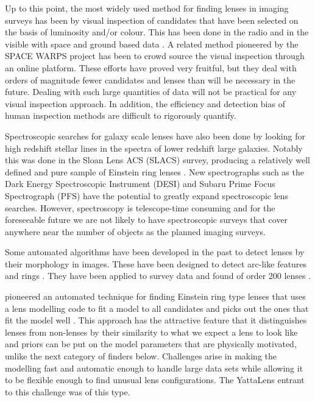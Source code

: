 \documentclass{aa}
\begin{document}
Up to this point, the most widely used method for finding lenses in imaging surveys has been by visual inspection of candidates that have been selected on the basis of luminosity and/or colour.  This has been done in the radio \citep{2003MNRAS.341...13B} and in the visible with space and ground based data \citep{2008MNRAS.389.1311J,2008ApJS..176...19F,2010AandA...517A..25S,2014MNRAS.439.3392P}.  A related method pioneered by the SPACE WARPS project \citep{2016MNRAS.455.1171M,2016MNRAS.455.1191M,2015MNRAS.452..502G} has been to crowd source the visual inspection through an online platform.  These efforts have proved very fruitful, but they deal with orders of magnitude fewer candidates and lenses than will be necessary in the future.  Dealing with such large quantities of data will not be practical for any visual inspection approach.  In addition, the efficiency and detection bias of human inspection methods are difficult to rigorously quantify.

Spectroscopic searches for galaxy scale lenses have also been done by looking for high redshift stellar lines in the spectra of lower redshift large galaxies.  Notably this was done in the Sloan Lens ACS (SLACS) survey, producing a relatively well defined and pure sample of Einstein ring lenses \citep{2006MNRAS.369.1521W,2006ApJ...638..703B,2012ApJ...744...41B,2015MNRAS.449.3441S}.  
New spectrographs such as the Dark Energy Spectroscopic Instrument  (DESI) \citep{2016arXiv161100036D} and Subaru Prime Focus Spectrograph (PFS) \citep{2016SPIE.9908E..1MT} have the potential to greatly expand spectroscopic lens searches.
However, spectroscopy is telescope-time consuming and for the foreseeable future we are not likely to have spectroscopic surveys that cover anywhere near the number of objects as the planned imaging surveys.

Some automated algorithms have been developed in the past to detect lenses by their morphology in images.  These have been designed to detect arc-like 
features \citep{2006astro.ph..6757A,2007AandA...472..341S, 2017AandA...597A.135B} and rings 
\citep{2014ApJ...785..144G,2014AandA...566A..63J}.  They have been applied to survey data and found of order 200 lenses \citep{2007AandA...461..813C,2012ApJ...749...38M,2016AandA...592A..75P}.  

\cite{2009ApJ...694..924M} pioneered an automated technique for finding Einstein ring type lenses that uses a lens modelling code to fit a model to all candidates and picks out the ones that fit the model well \citep[see also][]{2017arXiv170401585S}.   This approach has the attractive feature that it distinguishes lenses from non-lenses by their similarity to what we expect a lens to look like and priors can be put on the model parameters that are physically motivated, unlike the next category of finders below.  Challenges arise in making the modelling fast and automatic enough to handle large 
data sets while allowing it to be flexible enough to find unusual lens configurations.  The YattaLens entrant to this challenge was of this type.
\end{document}
